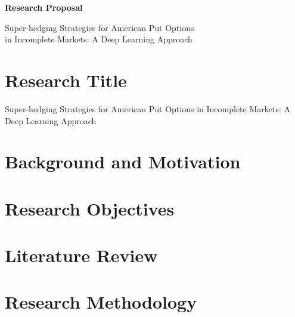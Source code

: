 \documentclass[12pt]{article}
\begin{document}

\centering
{\Large \bfseries Research Proposal}

\vspace{1cm}

{\large Super-hedging Strategies for American Put Options \\
in Incomplete Markets: A Deep Learning Approach}

\vspace{1.5cm}

\raggedright


\section{Research Title}
\label{sec:title}

Super-hedging Strategies for American Put Options in Incomplete Markets: A Deep Learning Approach


\section{Background and Motivation}
\label{sec:background}


\section{Research Objectives}
\label{sec:objectives}


\section{Literature Review}
\label{sec:lit_review}


\section{Research Methodology}
\label{sec:methodology}
\end{document}
